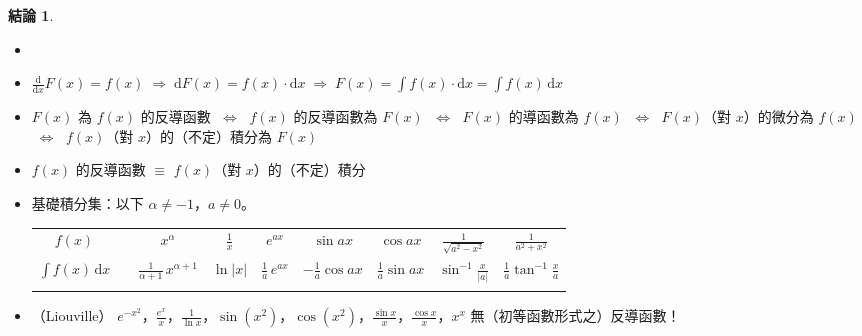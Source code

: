 \documentclass[12pt]{extarticle}
\newcommand{\ds}{\displaystyle}
\newcommand{\ie}{\;\Longrightarrow\;}
\newcommand{\ifff}{\;\Longleftrightarrow\;}
\theoremstyle{definition}
\newtheorem*{fact}{結論}
\begin{document}
\begin{fact}
  \begin{itemize}\setlength{\itemsep}{0pt}
    \item[]
    \item $\ds\frac{\text{d}}{\text{d}x} F(x) = f(x)\ie \text{d} F(x) = f(x)\cdot\text{d}x \ie F(x) = \int f(x)\cdot\text{d}x = \int f(x)\,\text{d}x$
    \item $F(x)$ 為 $f(x)$ 的反導函數 $\ifff$ $f(x)$ 的反導函數為 $F(x)$ $\ifff$ $F(x)$ 的導函數為 $f(x)$ $\ifff$ $F(x)$（對 $x$）的微分為 $f(x)$ $\ifff$ $f(x)$（對 $x$）的（不定）積分為 $F(x)$ 
    \item $f(x)$ 的反導函數 $\equiv$ $f(x)$（對 $x$）的（不定）積分
    \item 基礎積分集：以下 $\ds\alpha\ne -1$，$a\ne 0$。
      \begin{table}[!htbp]
        \centering
        \begin{tabular}{c|cccccccc}
          \toprule
          \addlinespace[2mm]
          $\ds f(x)$ & & $\ds x^\alpha$ & $\ds\frac{1}{x}$ & $\ds e^{a x}$ & $\ds\sin ax$ & $\ds\cos ax$ & $\ds\frac{1}{\sqrt{a^2 - x^2}}$ & $\ds\frac{1}{a^2 + x^2}$ \\
          \addlinespace[2mm]
          \midrule
          \addlinespace[2mm]
          $\ds \int f(x)\,\text{d}x$ & & $\ds\frac{1}{\alpha + 1}\,x^{\alpha + 1}$ & $\ds\ln |x|$ & $\ds\frac{1}{a}\,e^{a x}$ & $\ds-\frac{1}{a}\cos ax$ & $\ds\frac{1}{a}\sin ax$ & $\ds\sin^{-1}\frac{x}{|a|}$ & $\ds\frac{1}{a}\tan^{-1}\frac{x}{a}$ \\
          \addlinespace[2mm]
          \bottomrule
        \end{tabular}
      \end{table}
    \item（Liouville）{\color{M4} $\ds e^{-x^2}$，$\ds\frac{e^x}{x}$，$\ds\frac{1}{\ln x}$，$\ds\sin(x^2)$，$\ds\cos(x^2)$，$\ds\frac{\sin x}{x}$，$\ds\frac{\cos x}{x}$，$\ds x^x$ 無（初等函數形式之）反導函數！}
  \end{itemize}
\end{fact}
\end{document}
